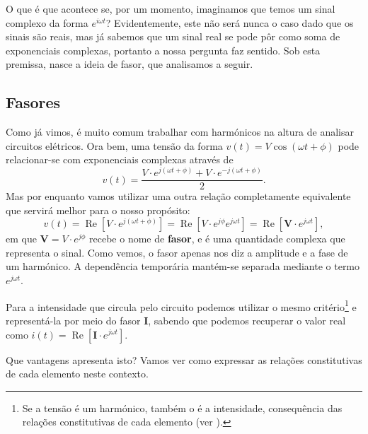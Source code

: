 O que é que acontece se, por um momento, imaginamos que temos um sinal complexo da forma $e^{i\omega t}$? Evidentemente, este não será nunca o caso dado que os sinais são reais, mas já sabemos que um sinal real se pode pôr como soma de exponenciais complexas, portanto a nossa pergunta faz sentido. Sob esta premissa, nasce a ideia de fasor, que analisamos a seguir.

\subsection{Fasores}
Como já vimos, é muito comum trabalhar com harmónicos na altura de analisar circuitos elétricos. Ora bem, uma tensão da forma $v(t) = V \cos(\omega t + \phi)$ pode relacionar-se com exponenciais complexas através de
\[
v(t) = \frac{V\cdot e^{j(\omega t + \phi)} + V\cdot e^{-j(\omega t + \phi)}}{2}.
\]
Mas por enquanto vamos utilizar uma outra relação completamente equivalente que servirá melhor para o nosso propósito:
\[
v(t) = \operatorname{Re} \left[V \cdot e^{j(\omega t + \phi)}\right] = \operatorname{Re} \left [V \cdot e^{j\phi} e^{j\omega t}\right] = \operatorname{Re} \left[\mathbf{V} \cdot  e^{j\omega t}\right],
\]
em que $\mathbf{V} = V \cdot e^{j\phi}$ recebe o nome de \textbf{fasor}, e é uma quantidade complexa que representa o sinal. Como vemos, o fasor apenas nos diz a amplitude e a fase de um harmónico. A dependência temporária mantém-se separada mediante o termo $e^{j\omega t}$.

Para a intensidade que circula pelo circuito podemos utilizar o mesmo critério\footnote{Se a tensão é um harmónico, também o é a intensidade, consequência das relações constitutivas de cada elemento (ver \cite{FasorIntensidad}).} e representá-la por meio do fasor $\mathbf{I}$, sabendo que podemos recuperar o valor real como $i(t)=\operatorname{Re}\left[\mathbf{I}\cdot e^{j\omega t}\right]$.

Que vantagens apresenta isto? Vamos ver como expressar as relações constitutivas de cada elemento neste contexto.

